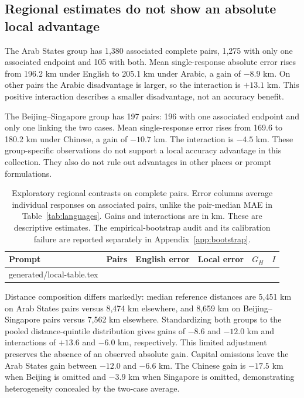 \documentclass[12pt,a4paper]{article}
\makeatletter
\newcommand{\tableinput}[1]{\@@input #1 }
\makeatother
\begin{document}
\subsection{Regional estimates do not show an absolute local advantage}
The Arab States group has 1,380 associated complete pairs, 1,275 with only one associated endpoint and 105 with both. Mean single-response absolute error rises from 196.2 km under English to 205.1 km under Arabic, a gain of $-8.9$ km. On other pairs the Arabic disadvantage is larger, so the interaction is $+13.1$ km. This positive interaction describes a smaller disadvantage, not an accuracy benefit.

The Beijing--Singapore group has 197 pairs: 196 with one associated endpoint and only one linking the two cases. Mean single-response error rises from 169.6 to 180.2 km under Chinese, a gain of $-10.7$ km. The interaction is $-4.5$ km. These group-specific observations do not support a local accuracy advantage in this collection. They also do not rule out advantages in other places or prompt formulations.

\begin{table}[htbp]\centering\small
\caption{Exploratory regional contrasts on complete pairs. Error columns average individual responses on associated pairs, unlike the pair-median MAE in Table~\ref{tab:languages}. Gains and interactions are in km. These are descriptive estimates. The empirical-bootstrap audit and its calibration failure are reported separately in Appendix~\ref{app:bootstrap}.}\label{tab:local}
\begin{tabular}{lrrrrr}\toprule Prompt & Pairs & English error & Local error & $G_H$ & $I$ \\\midrule
\tableinput{generated/local-table.tex}
\bottomrule\end{tabular}
\end{table}


Distance composition differs markedly: median reference distances are 5,451 km on Arab States pairs versus 8,474 km elsewhere, and 8,659 km on Beijing--Singapore pairs versus 7,562 km elsewhere. Standardizing both groups to the pooled distance-quintile distribution gives gains of $-8.6$ and $-12.0$ km and interactions of $+13.6$ and $-6.0$ km, respectively. This limited adjustment preserves the absence of an observed absolute gain. Capital omissions leave the Arab States gain between $-12.0$ and $-6.6$ km. The Chinese gain is $-17.5$ km when Beijing is omitted and $-3.9$ km when Singapore is omitted, demonstrating heterogeneity concealed by the two-case average.
\end{document}
